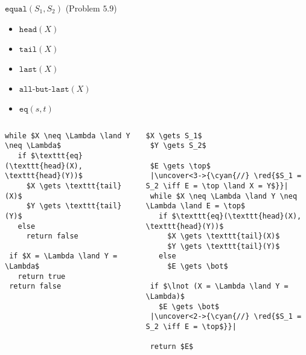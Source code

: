 
\begin{frame}{}
  \begin{exampleblock}{$\texttt{equal}(S_1,S_2)$ (Problem $5.9$)}
    \begin{itemize}
      \item $\texttt{head}(X)$
      \item $\texttt{tail}(X)$
      \item $\texttt{last}(X)$
      \item $\texttt{all-but-last}(X)$
      \item $\texttt{eq}(s,t)$
    \end{itemize}
  \end{exampleblock}
\end{frame}

\begin{frame}[fragile]{}
  \begin{columns}
  \begin{lstlisting}[style = CStyle]
 while $X \neq \Lambda \land Y \neq \Lambda$
   if $\texttt{eq}(\texttt{head}(X), \texttt{head}(Y))$
     $X \gets \texttt{tail}(X)$
     $Y \gets \texttt{tail}(Y)$
   else
     return false

 if $X = \Lambda \land Y = \Lambda$
   return true
 return false
  \end{lstlisting}
  \begin{lstlisting}[style = CStyle]
 $X \gets S_1$
 $Y \gets S_2$

 $E \gets \top$
 |\uncover<3->{\cyan{//} \red{$S_1 = S_2 \iff E = \top \land X = Y$}}|
 while $X \neq \Lambda \land Y \neq \Lambda \land E = \top$
   if $\texttt{eq}(\texttt{head}(X), \texttt{head}(Y))$
     $X \gets \texttt{tail}(X)$
     $Y \gets \texttt{tail}(Y)$
   else
     $E \gets \bot$

 if $\lnot (X = \Lambda \land Y = \Lambda)$
   $E \gets \bot$
 |\uncover<2->{\cyan{//} \red{$S_1 = S_2 \iff E = \top$}}|

 return $E$
  \end{lstlisting}
  \end{columns}

\end{frame}

